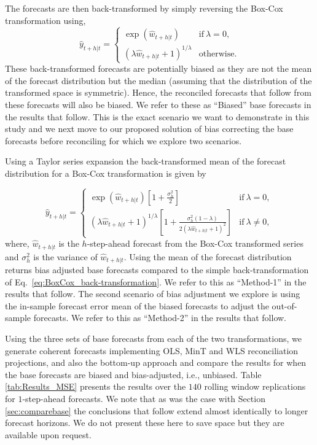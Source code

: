 \documentclass[12pt]{article}
\theoremstyle{definition}
\begin{document}
The forecasts are then back-transformed by simply reversing the Box-Cox transformation using,
\begin{equation} \label{eq:BoxCox_back-transformation}
	\hat{y}_{t+h|t} =
	\begin{cases}
	\exp({\hat{w}_{t+h|t}}) & \text{if}~\lambda = 0, \\
	(\lambda \hat{w}_{t+h|t} + 1)^{1/\lambda}  & \text{otherwise.}
	\end{cases}
\end{equation}
These back-transformed forecasts are potentially biased as they are not the mean of the forecast distribution but the median (assuming that the distribution of the transformed space is symmetric). Hence, the reconciled forecasts that follow from these forecasts will also be biased. We refer to these as ``Biased'' base forecasts in the results that follow. This is the exact scenario we want to demonstrate in this study and we next move to our proposed solution of bias correcting the base forecasts before reconciling for which we explore two scenarios.

Using a Taylor series expansion  the back-transformed mean of the forecast distribution for a Box-Cox transformation is given by

\begin{equation} \label{eq:BoxCox_BT_biasadj}
	 \hat{y}_{t+h|t} =
	\begin{cases}
	\exp({\hat{w}_{t+h|t}})[1+\frac{\sigma_h^2}{2}] & \text{if}~\lambda = 0, \\
	(\lambda \hat{w}_{t+h|t} + 1)^{1/\lambda}[1 + \frac{\sigma_h^2(1-\lambda)}{2(\lambda \hat{w}_{t+h|t} + 1)^2}]       & \text{if}~\lambda \ne 0,
	\end{cases}
	\end{equation}
where, $\hat{w}_{t+h|t}$ is the $h$-step-ahead forecast from the Box-Cox transformed series and $\sigma_h^2$ is the variance of $\hat{w}_{t+h|t}$. Using the mean of the forecast distribution returns bias adjusted base forecasts compared to the simple back-transformation of Eq.~\eqref{eq:BoxCox_back-transformation}. We refer to this as ``Method-1'' in the results that follow. The second scenario of bias adjustment we explore is using the in-sample forecast error mean of the biased forecasts to adjust the out-of-sample forecasts. We refer to this as ``Method-2'' in the results that follow.

Using the three sets of base forecasts from each of the two transformations, we generate coherent forecasts implementing OLS, MinT and WLS reconciliation projections, and also the bottom-up approach and compare the results for when the base forecasts are biased and bias-adjusted, i.e., unbiased. Table \ref{tab:Results_MSE} presents the results over the $140$ rolling window replications for $1$-step-ahead forecasts. We note that as was the case with Section \ref{sec:comparebase} the conclusions that follow extend almost identically to longer forecast horizons. We do not present these here to save space but they are available upon request.
\end{document}
